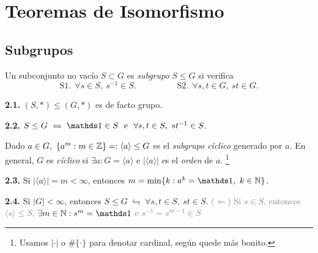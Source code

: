 \section{Teoremas de Isomorfismo}

\subsection*{Subgrupos}

\begin{definition}
    Un subconjunto no vacío \(S\subset G\) es \emph{subgrupo} \(S\leq G\) si verifica  
    \[\text{S}1. \ \ \forall s \in S, \ s^{-1} \in S. \hspace{2cm} \text{S}2. \ \ \forall s,t\in G, \ st\in G.\]
\end{definition}

\begin{theorem}
    \textbf{2.1.} \((S,*)\leq (G,*)\) es de facto grupo. 
\end{theorem}

\begin{theorem}
    \textbf{2.2.} \(S\leq G \ \leftrightharpoons \ \id \in S \ \text{ e } \ \forall s,t \in S, \ st^{-1} \in S\).  
\end{theorem}

\begin{definition}
    Dado \(a \in G, \ \{a^m : m \in \mathbb{Z}\}=: \langle a \rangle \leq G\) es el \emph{subgrupo cíclico} generado por \(a\). En general, \(G\) es \emph{cíclico} si \(\exists a : G = \langle a \rangle\) e \(|\langle a \rangle|\) es el \emph{orden} de \(a\). \footnote{Usamos \(|\cdot |\) o \(\#\{\cdot\}\) para denotar cardinal, según quede más bonito.}
\end{definition}

\begin{theorem}
    \textbf{2.3.} Si \(|\langle a \rangle | = m < \infty\), entonces \(m = \min \{k : a^k = \id, \ k \in \N\}\). 
\end{theorem}


\begin{corollary}
    \textbf{2.4.} Si \(|G| < \infty\), entonces \(S \leq G \ \leftrightharpoons \ \forall s,t \in S, \ st \in S\). \textcolor{gray}{(\(\Leftarrow\)) Si \(s \in S\), entonces \(\langle s\rangle \leq S\), \(\exists m \in \N: s^m = \id\) e \(s^{-1} = s^{m-1} \in S\) }  
\end{corollary}

